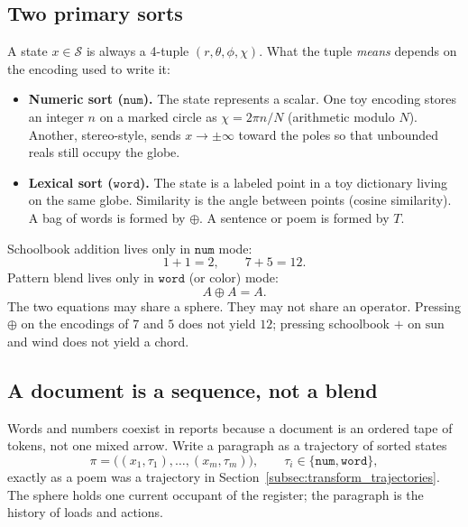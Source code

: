 \documentclass[12pt, a4paper]{article}
\begin{document}
\subsection{Two primary sorts}
\label{subsec:sorts}
A state $x\in\mathcal{S}$ is always a 4-tuple
$(r,\theta,\phi,\chi)$. What the tuple \emph{means} depends on the
encoding used to write it:
\begin{itemize}
    \item \textbf{Numeric sort ($\mathtt{num}$).}
          The state represents a scalar. One toy encoding stores an
          integer $n$ on a marked circle as
          $\chi = 2\pi n/N$ (arithmetic modulo $N$).
          Another, stereo-style, sends $x\to\pm\infty$ toward the
          poles so that unbounded reals still occupy the globe.
    \item \textbf{Lexical sort ($\mathtt{word}$).}
          The state is a labeled point in a toy dictionary living on
          the same globe. Similarity is the angle between points
          (cosine similarity). A bag of words is formed by $\oplus$.
          A sentence or poem is formed by $T$.
\end{itemize}
Schoolbook addition lives only in $\mathtt{num}$ mode:
\begin{equation}
    1 + 1 = 2, \qquad 7 + 5 = 12.
\end{equation}
Pattern blend lives only in $\mathtt{word}$ (or color) mode:
\begin{equation}
    A \oplus A = A.
\end{equation}
The two equations may share a sphere. They may not share an operator.
Pressing $\oplus$ on the encodings of $7$ and $5$ does not yield $12$;
pressing schoolbook $+$ on $\mathrm{sun}$ and $\mathrm{wind}$ does not
yield a chord.

\subsection{A document is a sequence, not a blend}
\label{subsec:document_sequence}
Words and numbers coexist in reports because a document is an ordered
tape of tokens, not one mixed arrow. Write a paragraph as a trajectory
of sorted states
\begin{equation}
    \pi = \bigl((x_1,\tau_1),\ldots,(x_m,\tau_m)\bigr),
    \qquad \tau_i\in\{\mathtt{num},\mathtt{word}\},
    \label{eq:mixed_document}
\end{equation}
exactly as a poem was a trajectory in
Section~\ref{subsec:transform_trajectories}. The sphere holds one
current occupant of the register; the paragraph is the history of
loads and actions.
\end{document}
